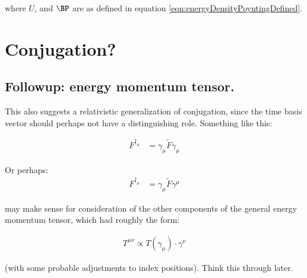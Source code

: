 \documentclass{article}
\begin{document}
where $U$, and $\BP$ are as defined in equation \ref{eqn:energyDensityPoyntingDefined}.

%
%


\section{ Conjugation? }
\subsection{ Followup: energy momentum tensor. }

This also suggests a relativistic generalization of conjugation, since the time basis vector should perhaps not have
a distinguishing role.  Something like this:

\begin{align*}
F^{\dagger_\mu} &= \gamma_\mu \tilde{F} \gamma_\mu
\end{align*}

Or perhaps:
\begin{align*}
F^{\dagger_\mu} &= \gamma_\mu \tilde{F} \gamma^\mu
\end{align*}

may make sense for consideration of the other components of the general energy momentum tensor, which had roughly the form:

\begin{align*}
T^{\mu\nu} \propto T(\gamma_\mu) \cdot \gamma^\nu
\end{align*}

(with some probable adjustments to index positions).  Think this through later.



\end{document}
